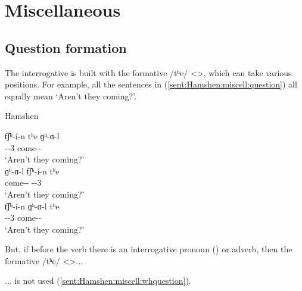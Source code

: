 \section{Miscellaneous}

\subsection{Question formation}

The interrogative is built with the formative /tʰe/ <>, which can take various positions. For example, all the sentences in (\ref{sent:Hamshen:miscell:question}) all equally mean `Aren't they coming?'. 

\begin{exe}
	\ex Hamshen \label{sent:Hamshen:miscell:question}
	\begin{xlist}
		\ex \gll t͡ʃʰ-\'i-n tʰe ɡʰ-ɑ-l \\
		{\neggloss}-{\aux}-3{\pl} {\q} come-{\thgloss}-{\cn} \\
		\trans `Aren't they coming?' \\
		\ex \gll ɡʰ-ɑ-l t͡ʃʰ-\'i-n tʰe \\
		come-{\thgloss}-{\cn} {\neggloss}-{\aux}-3{\pl} {\q} \\
		\trans `Aren't they coming?' \\
		\ex \gll t͡ʃʰ-\'i-n ɡʰ-ɑ-l tʰe \\
		{\neggloss}-{\aux}-3{\pl} come-{\thgloss}-{\cn} {\q} \\
		\trans `Aren't they coming?' \\
	\end{xlist}
\end{exe}



But, if before the verb there is an interrogative pronoun () or adverb, then the formative /tʰe/ <>... 


\begin{adjarianpage}\label{page:190}\end{adjarianpage}%

... is not used (\ref{sent:Hamshen:miscell:whquestion}). 

